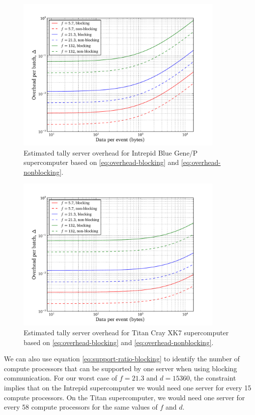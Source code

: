 \begin{figure}[htb]
  \centering
  \includegraphics[width=4in]{figures/ch6/model_intrepid}
  \caption{Estimated tally server overhead for Intrepid Blue Gene/P
    supercomputer based on \eqref{eq:overhead-blocking} and
    \eqref{eq:overhead-nonblocking}.}
  \label{fig:model-intrepid}
\end{figure}

\begin{figure}[htb]
  \centering
  \includegraphics[width=4in]{figures/ch6/model_titan}
  \caption{Estimated tally server overhead for Titan Cray XK7 supercomputer
    based on \eqref{eq:overhead-blocking} and \eqref{eq:overhead-nonblocking}.}
  \label{fig:model-titan}
\end{figure}

We can also use equation \eqref{eq:support-ratio-blocking} to identify the
number of compute processors that can be supported by one server when using
blocking communication. For our worst case of $f = 21.3$ and $d = 15360$, the
constraint implies that on the Intrepid supercomputer we would need one server
for every 15 compute processors. On the Titan supercomputer, we would need one
server for every 58 compute processors for the same values of $f$ and $d$.

